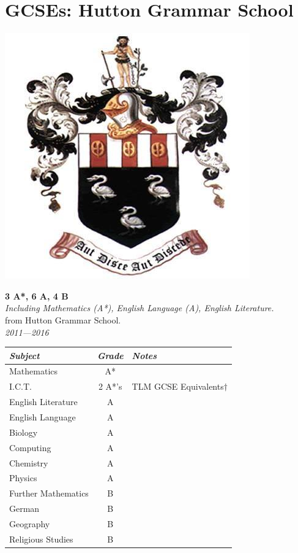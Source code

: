 \documentclass[9pt,a4paper]{article}
\begin{document}
\pagebreak


\section{GCSEs: Hutton Grammar School}

\begin{center}
	\includegraphics[height=0.15\textheight]{hgs.jpg}
\end{center}
\begin{center}
	\noindent\textbf{3 A*, 6 A, 4 B}\\
	\noindent\textit{Including Mathematics (A*), English Language (A), English Literature.}\\
	\noindent from Hutton Grammar School.\\
	\noindent\emph{2011---2016}
\end{center}


\begin{center}\begin{tabular}{p{4.2cm}|c|p{4.5cm}}
	\emph{Subject}&\emph{Grade}&\emph{Notes}\\\hline\hline
	Mathematics & A* & \\
	I.C.T. & 2 A*'s &TLM GCSE Equivalents$\dagger$\\
	English Literature& A &\\
	English Language&A&\\
	Biology&A&\\
	Computing& A &\\
	Chemistry & A &\\
	Physics&A&\\
	Further Mathematics&B&\\
	German&B&\\
	Geography&B&\\
	Religious Studies&B&
\end{tabular}\end{center}
\end{document}
